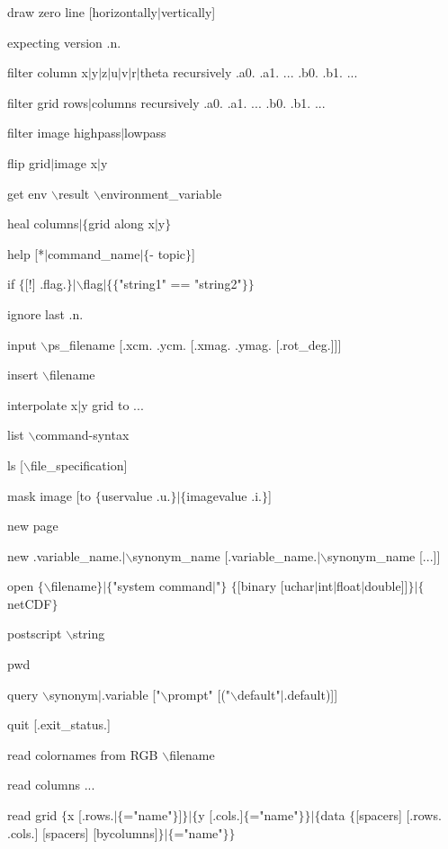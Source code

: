 draw zero line [horizontally$\mid$vertically]

expecting version .n.

filter column x$\mid$y$\mid$z$\mid$u$\mid$v$\mid$r$\mid$theta recursively .a0. .a1. ... .b0. .b1. ...

filter grid rows$\mid$columns recursively .a0. .a1. ... .b0. .b1. ...

filter image highpass$\mid$lowpass

flip grid$\mid$image x$\mid$y

get env $\backslash$result $\backslash$environment\_variable

heal columns$\mid$$\lbrace$grid along x$\mid$y$\rbrace$

help [*$\mid$command\_name$\mid$$\lbrace$- topic$\rbrace$]

if $\lbrace$[!] .flag.$\rbrace$$\mid$$\backslash$flag$\mid$$\lbrace$$\lbrace$"string1" == "string2"$\rbrace$$\rbrace$

ignore last .n.

input $\backslash$ps\_filename [.xcm. .ycm. [.xmag. .ymag. [.rot\_deg.]]]

insert $\backslash$filename

interpolate x$\mid$y grid to ...

list $\backslash$command-syntax

ls [$\backslash$file\_specification]

mask image [to $\lbrace$uservalue .u.$\rbrace$$\mid$$\lbrace$imagevalue .i.$\rbrace$]

new page

new .variable\_name.$\mid$$\backslash$synonym\_name [.variable\_name.$\mid$$\backslash$synonym\_name [...]]

open $\lbrace$$\backslash$filename$\rbrace$$\mid$$\lbrace$"system command$\mid$"$\rbrace$ $\lbrace$[binary [uchar$\mid$int$\mid$float$\mid$double]]$\rbrace$$\mid$$\lbrace$netCDF$\rbrace$

postscript $\backslash$string

pwd

query $\backslash$synonym$\mid$.variable ["$\backslash$prompt" [("$\backslash$default"$\mid$.default)]]

quit [.exit\_status.]

read colornames from RGB $\backslash$filename

read columns ...

read grid $\lbrace$x [.rows.$\mid$$\lbrace$="name"$\rbrace$]$\rbrace$$\mid$$\lbrace$y [.cols.]$\lbrace$="name"$\rbrace$$\rbrace$$\mid$$\lbrace$data $\lbrace$[spacers] [.rows. .cols.] [spacers] [bycolumns]$\rbrace$$\mid$$\lbrace$="name"$\rbrace$$\rbrace$

